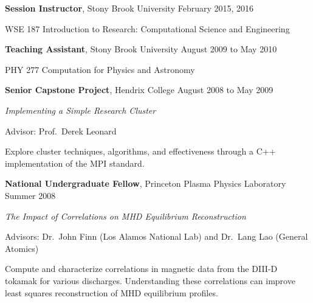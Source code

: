 \documentclass[10pt]{article}
\newcommand{\halfblankline}{\quad\vspace{-0.5\baselineskip}\pagebreak[3]}
\begin{document}
\halfblankline

\textbf{Session Instructor}, Stony Brook University \hfill {February 2015, 2016}
\begin{innerlist}

    \item[] WSE 187 Introduction to Research: Computational Science and Engineering

\end{innerlist}

\halfblankline

\textbf{Teaching Assistant}, Stony Brook University \hfill {August 2009 to May 2010}
\begin{innerlist}

    \item[] PHY 277 Computation for Physics and Astronomy

\end{innerlist}

\halfblankline

\textbf{Senior Capstone Project}, Hendrix College \hfill {August 2008 to May 2009}
\begin{innerlist}

    \item[] \emph{Implementing a Simple Research Cluster}
    \item[] Advisor: Prof.~Derek Leonard
    \item[] Explore cluster techniques, algorithms, and effectiveness through a C++
            implementation of the MPI standard.

\end{innerlist}

\halfblankline

\textbf{National Undergraduate Fellow}, Princeton Plasma Physics Laboratory \hfill {Summer 2008}
\begin{innerlist}

    \item[] \emph{The Impact of Correlations on MHD Equilibrium Reconstruction}
    \item[] Advisors: Dr.~John Finn (Los Alamos National Lab) 
            and Dr.~Lang Lao (General Atomics)
    \item[] Compute and characterize correlations in magnetic data from the
            DIII-D tokamak for various discharges. Understanding these correlations
            can improve least squares reconstruction of MHD equilibrium profiles.
\end{innerlist}
\end{document}
